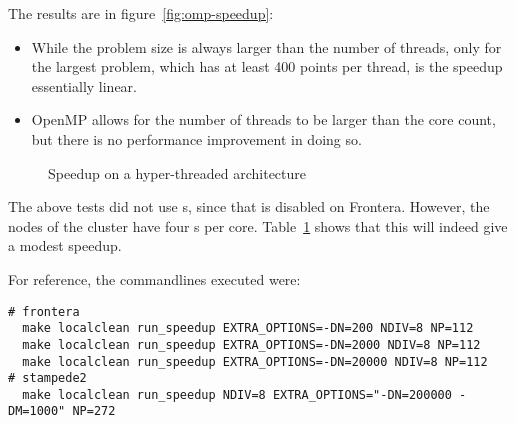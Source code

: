 The results are in figure~\ref{fig:omp-speedup}:
\begin{itemize}
\item While the problem size is always larger than the number of threads,
  only for the largest problem,
  which has at least 400 points per thread,
  is the speedup essentially linear.
\item OpenMP allows for the number of threads to be larger than the core count,
  but there is no performance improvement in doing so.
\end{itemize}

\begin{figure}
  \caption{Speedup on a hyper-threaded architecture}
  \label{fig:omp-speed-hyper}
\end{figure}

The above tests did not use s,
since that is disabled on Frontera.
However, the  nodes
of the  cluster
have four s per core.
Table~\ref{fig:omp-speed-hyper} shows that this will indeed give a modest speedup.

For reference, the commandlines executed were:
\begin{verbatim}
# frontera
  make localclean run_speedup EXTRA_OPTIONS=-DN=200 NDIV=8 NP=112
  make localclean run_speedup EXTRA_OPTIONS=-DN=2000 NDIV=8 NP=112
  make localclean run_speedup EXTRA_OPTIONS=-DN=20000 NDIV=8 NP=112
# stampede2
  make localclean run_speedup NDIV=8 EXTRA_OPTIONS="-DN=200000 -DM=1000" NP=272
\end{verbatim}

